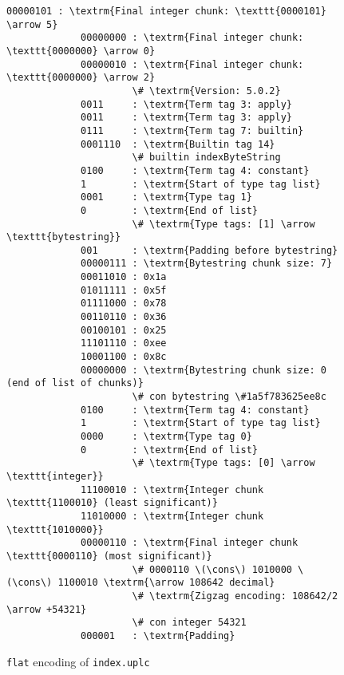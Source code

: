 \begin{figure}[H]
  \centering
  {\small
        \begin{Verbatim}[commandchars=\\\{\}]
             00000101 : \textrm{Final integer chunk: \texttt{0000101} \arrow 5}
             00000000 : \textrm{Final integer chunk: \texttt{0000000} \arrow 0}
             00000010 : \textrm{Final integer chunk: \texttt{0000000} \arrow 2}
                      \# \textrm{Version: 5.0.2}
             0011     : \textrm{Term tag 3: apply}
             0011     : \textrm{Term tag 3: apply}
             0111     : \textrm{Term tag 7: builtin}
             0001110  : \textrm{Builtin tag 14}
                      \# builtin indexByteString
             0100     : \textrm{Term tag 4: constant}
             1        : \textrm{Start of type tag list}
             0001     : \textrm{Type tag 1}
             0        : \textrm{End of list}
                      \# \textrm{Type tags: [1] \arrow \texttt{bytestring}}
             001      : \textrm{Padding before bytestring}
             00000111 : \textrm{Bytestring chunk size: 7}
             00011010 : 0x1a
             01011111 : 0x5f
             01111000 : 0x78
             00110110 : 0x36
             00100101 : 0x25
             11101110 : 0xee
             10001100 : 0x8c
             00000000 : \textrm{Bytestring chunk size: 0 (end of list of chunks)}
                      \# con bytestring \#1a5f783625ee8c
             0100     : \textrm{Term tag 4: constant}
             1        : \textrm{Start of type tag list}
             0000     : \textrm{Type tag 0}
             0        : \textrm{End of list}
                      \# \textrm{Type tags: [0] \arrow \texttt{integer}}
             11100010 : \textrm{Integer chunk \texttt{1100010} (least significant)}
             11010000 : \textrm{Integer chunk \texttt{1010000}}
             00000110 : \textrm{Final integer chunk \texttt{0000110} (most significant)}
                      \# 0000110 \(\cons\) 1010000 \(\cons\) 1100010 \textrm{\arrow 108642 decimal}
                      \# \textrm{Zigzag encoding: 108642/2 \arrow +54321}
                      \# con integer 54321
             000001   : \textrm{Padding}
        \end{Verbatim}
        }
      \caption{\texttt{flat} encoding of \texttt{index.uplc}}
      \label{fig:index-bytestring-example}
  \end{figure}
